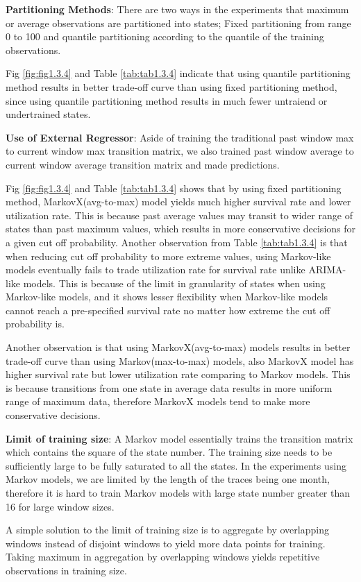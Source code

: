 \documentclass{article}
\begin{document}
\begin{flushleft}
\textbf{Partitioning Methods}: There are two ways in the experiments that maximum or average observations are partitioned into states; Fixed partitioning from range 0 to 100 and quantile partitioning according to the quantile of the training observations. 

Fig \ref{fig:fig1.3.4} and Table \ref{tab:tab1.3.4} indicate that using quantile partitioning method results in better trade-off curve than using fixed partitioning method, since using quantile partitioning method results in much fewer untraiend or undertrained states.
\end{flushleft}

\begin{flushleft}
\textbf{Use of External Regressor}: Aside of training the traditional past window max to current window max transition matrix, we also trained past window average to current window average transition matrix and made predictions. 

Fig \ref{fig:fig1.3.4} and Table \ref{tab:tab1.3.4} shows that by using fixed partitioning method, MarkovX(avg-to-max) model yields much higher survival rate and lower utilization rate. This is because past average values may transit to wider range of states than past maximum values, which results in more conservative decisions for a given cut off probability. Another observation from Table \ref{tab:tab1.3.4} is that when reducing cut off probability to more extreme values, using Markov-like models eventually fails to trade utilization rate for survival rate unlike ARIMA-like models. This is because of the limit in granularity of states when using Markov-like models, and it shows lesser flexibility when Markov-like models cannot reach a pre-specified survival rate no matter how extreme the cut off probability is. 

Another observation is that using MarkovX(avg-to-max) models results in better trade-off curve than using Markov(max-to-max) models, also MarkovX model has higher survival rate but lower utilization rate comparing to Markov models. This is because transitions from one state in average data results in more uniform range of maximum data, therefore MarkovX models tend to make more conservative decisions.
\end{flushleft}

\begin{flushleft}
\textbf{Limit of training size}: A Markov model essentially trains the transition matrix which contains the square of the state number. The training size needs to be sufficiently large to be fully saturated to all the states. In the experiments using Markov models, we are limited by the length of the traces being one month, therefore it is hard to train Markov models with large state number greater than 16 for large window sizes.

A simple solution to the limit of training size is to aggregate by overlapping windows instead of disjoint windows to yield more data points for training. Taking maximum in aggregation by overlapping windows yields repetitive observations in training size.
\end{flushleft}
\end{document}
